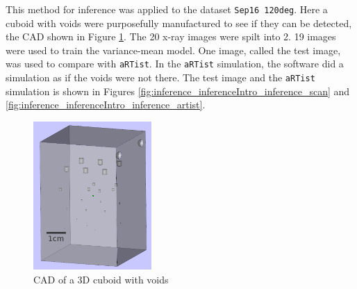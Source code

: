 This method for inference was applied to the dataset \texttt{Sep16 120deg}. Here a cuboid with voids were purposefully manufactured to see if they can be detected, the CAD shown in Figure \ref{fig:inference_testObject}. The 20 x-ray images were spilt into 2. 19 images were used to train the variance-mean model. One image, called the test image, was used to compare with \texttt{aRTist}. In the \texttt{aRTist} simulation, the software did a simulation as if the voids were not there. The test image and the \texttt{aRTist} simulation is shown in Figures \ref{fig:inference_inferenceIntro_inference_scan} and \ref{fig:inference_inferenceIntro_inference_artist}.

\begin{figure}
  \centering
  \includegraphics[width=0.4\textwidth]{../figures/inference/TestObject.png}
  \caption{CAD of a 3D cuboid with voids}
  \label{fig:inference_testObject}
\end{figure}

